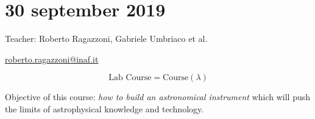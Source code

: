 \documentclass[main.tex]{subfiles}
\begin{document}
\section*{30 september 2019}

Teacher: Roberto Ragazzoni, Gabriele Umbriaco et al.

\url{roberto.ragazzoni@inaf.it}

\begin{equation}
    \text{Lab Course} = \text{Course} (\lambda)
\end{equation}

Objective of this course: \emph{how to build an astronomical instrument} which will push the limits of astrophysical knowledge and technology.
\end{document}
